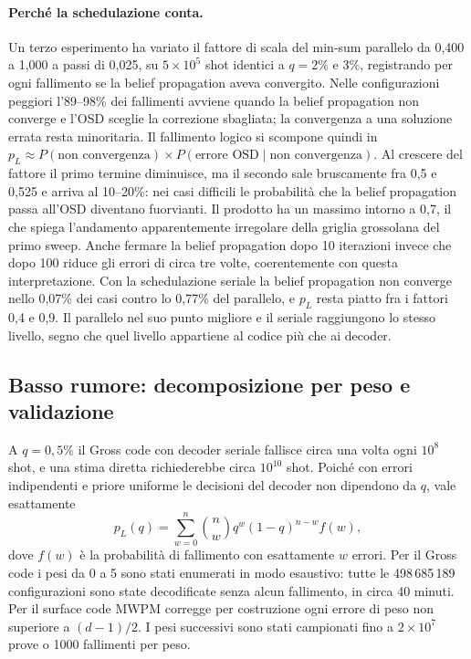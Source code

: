 \begin{onehalfspace}
\paragraph{Perché la schedulazione conta.} Un terzo esperimento ha
variato il fattore di scala del min-sum parallelo da 0,400 a 1,000 a
passi di 0,025, su $5\times10^5$ shot identici a $q = 2\%$ e $3\%$,
registrando per ogni fallimento se la belief propagation aveva
convergito. Nelle configurazioni peggiori l'89--98\% dei fallimenti
avviene quando la belief propagation non converge e l'OSD sceglie la
correzione sbagliata; la convergenza a una soluzione errata resta
minoritaria. Il fallimento logico si scompone quindi in
$p_L \approx P(\text{non convergenza}) \times P(\text{errore OSD}\mid\text{non convergenza})$.
Al crescere del fattore il primo termine diminuisce, ma il secondo sale
bruscamente fra 0,5 e 0,525 e arriva al 10--20\%: nei casi difficili le
probabilità che la belief propagation passa all'OSD diventano
fuorvianti. Il prodotto ha un massimo intorno a 0,7, il che spiega
l'andamento apparentemente irregolare della griglia grossolana del primo
sweep. Anche fermare la belief propagation dopo 10 iterazioni invece che
dopo 100 riduce gli errori di circa tre volte, coerentemente con questa
interpretazione. Con la schedulazione seriale la belief propagation non
converge nello 0,07\% dei casi contro lo 0,77\% del parallelo, e $p_L$
resta piatto fra i fattori 0,4 e 0,9. Il parallelo nel suo punto
migliore e il seriale raggiungono lo stesso livello, segno che quel
livello appartiene al codice più che ai decoder.

\subsection{Basso rumore: decomposizione per peso e validazione}
\label{app:gross_peso}

A $q = 0{,}5\%$ il Gross code con decoder seriale fallisce circa una volta
ogni $10^8$ shot, e una stima diretta richiederebbe circa $10^{10}$ shot.
Poiché con errori indipendenti e priore uniforme le decisioni del decoder
non dipendono da $q$, vale esattamente
\begin{equation}
p_L(q) = \sum_{w=0}^{n} \binom{n}{w} q^{w} (1-q)^{n-w} f(w),
\label{eq:app_gross_peso}
\end{equation}
dove $f(w)$ è la probabilità di fallimento con esattamente $w$ errori.
Per il Gross code i pesi da 0 a 5 sono stati enumerati in modo
esaustivo: tutte le 498\,685\,189 configurazioni sono state decodificate
senza alcun fallimento, in circa 40 minuti. Per il surface code \ac{MWPM}
corregge per costruzione ogni errore di peso non superiore a $(d-1)/2$.
I pesi successivi sono stati campionati fino a $2\times10^7$ prove o 1000
fallimenti per peso.


\end{onehalfspace}
